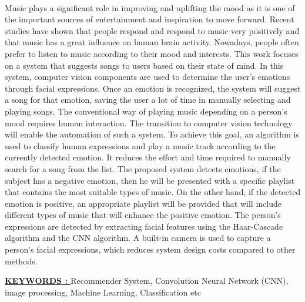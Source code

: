 \documentclass[12pt]{report}
\begin{document}
\vspace{4 cm}
\\
\vspace{1 cm}
\justifying
\setlength{\parindent}{4em}
\setlength{\parskip}{1em}
\renewcommand{\baselinestretch}{1.5}
\normalsize
Music plays a significant role in improving and uplifting the mood as it is one of the important 
sources of entertainment and inspiration to move forward. Recent studies have shown that people 
respond and respond to music very positively and that music has a great influence on human brain 
activity. Nowadays, people often prefer to listen to music according to their mood and interests. This 
work focuses on a system that suggests songs to users based on their state of mind. In this system, 
computer vision components are used to determine the user's emotions through facial expressions. 
Once an emotion is recognized, the system will suggest a song for that emotion, saving the user a 
lot of time in manually selecting and playing songs. The conventional way of playing music 
depending on a person's mood requires human interaction. The transition to computer vision 
technology will enable the automation of such a system. To achieve this goal, an algorithm is used 
to classify human expressions and play a music track according to the currently detected emotion. It 
reduces the effort and time required to manually search for a song from the list. The proposed system 
detects emotions, if the subject has a negative emotion, then he will be presented with a specific 
playlist that contains the most suitable types of music. On the other hand, if the detected emotion is 
positive, an appropriate playlist will be provided that will include different types of music that will 
enhance the positive emotion. The person's expressions are detected by extracting facial features 
using the Haar-Cascade algorithm and the CNN algorithm. A built-in camera is used to capture a 
person's facial expressions, which reduces system design costs compared to other methods.



\raggedright{ \textbf \underline{KEYWORDS : }}Recommender System, Convolution Neural Network (CNN), image processing,
Machine Learning, Classification etc

\clearpage



\tableofcontents
\clearpage
\end{document}
